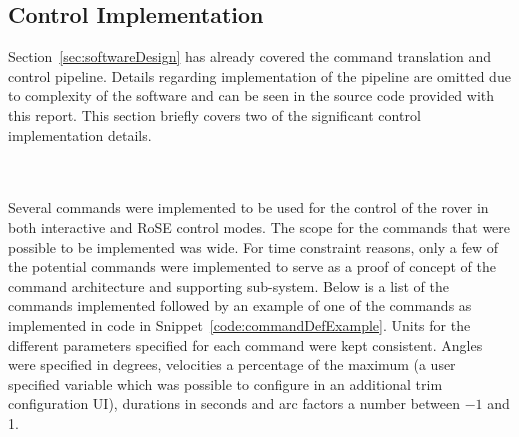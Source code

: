     \subsection{Control Implementation}
      Section~\ref{sec:softwareDesign} has already covered the command translation and control pipeline. Details regarding implementation of the pipeline are omitted due to complexity of the software and can be seen in the source code provided with this report. This section briefly covers two of the significant control implementation details.
      
      \\\\
        Several commands were implemented to be used for the control of the rover in both interactive and RoSE control modes. The scope for the commands that were possible to be implemented was wide. For time constraint reasons, only a few of the potential commands were implemented to serve as a proof of concept of the command architecture and supporting sub-system. Below is a list of the commands implemented followed by an example of one of the commands as implemented in code in Snippet~\ref{code:commandDefExample}. Units for the different parameters specified for each command were kept consistent. Angles were specified in degrees, velocities a percentage of the maximum (a user specified variable which was possible to configure in an additional trim configuration UI), durations in seconds and arc factors a number between $-1$ and 1.
        
